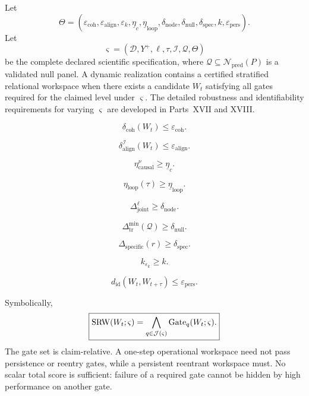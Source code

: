 

Let
\[
\Theta
=
\left(
\varepsilon_{\mathrm{coh}},
\varepsilon_{\mathrm{align}},
\varepsilon_k,
\underline\eta_c,
\underline\eta_{\mathrm{loop}},
\delta_{\mathrm{node}},
\delta_{\mathrm{null}},
\delta_{\mathrm{spec}},
k,
\varepsilon_{\mathrm{pers}}
\right).
\]
Let
\[
\varsigma
=
(\mathcal D,Y^+,\ell,\tau,\mathcal I,\mathcal Q,\Theta)
\]
be the complete declared scientific specification, where
\(\mathcal Q\subseteq\mathcal N_{\mathrm{pred}}(P)\) is a validated null panel.
A dynamic realization contains a certified stratified relational workspace
when there exists a candidate \(W_t\) satisfying all gates required for the
claimed level under \(\varsigma\). The detailed robustness and identifiability
requirements for varying \(\varsigma\) are developed in Parts~XVII and XVIII.

\[
\delta_{\mathrm{coh}}(W_t)
\leq
\varepsilon_{\mathrm{coh}}.
\]

\[
\delta_{\mathrm{align}}^{\mathcal I}(W_t)
\leq
\varepsilon_{\mathrm{align}}.
\]

\[
\eta_{\mathrm{causal}}^\nu
\geq
\underline\eta_c.
\]

\[
\eta_{\mathrm{loop}}(\tau)
\geq
\underline\eta_{\mathrm{loop}}.
\]

\[
\Delta_{\mathrm{joint}}^{\ell}
\geq
\delta_{\mathrm{node}}.
\]

\[
\Delta_{\mathrm{tr}}^{\min}(\mathcal Q)
\geq
\delta_{\mathrm{null}}.
\]

\[
\Delta_{\mathrm{specific}}(r)
\geq
\delta_{\mathrm{spec}}.
\]

\[
k_{\varepsilon_k}
\geq
k.
\]

\[
d_{\mathrm{id}}(W_t,W_{t+\tau})
\leq
\varepsilon_{\mathrm{pers}}.
\]

Symbolically,
\[
\boxed{
\operatorname{SRW}(W_t;\varsigma)
=
\bigwedge_{q\in\mathcal J(\varsigma)}
\operatorname{Gate}_q(W_t;\varsigma).
}
\]
The gate set is claim-relative. A one-step operational workspace need not pass
persistence or reentry gates, while a persistent reentrant workspace must.
No scalar total score is sufficient: failure of a required gate cannot be
hidden by high performance on another gate.

